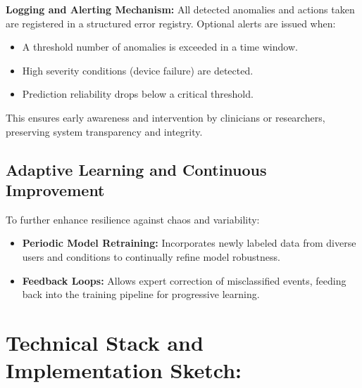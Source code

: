 \documentclass[conference]{IEEEtran}
\begin{document}
\item \textbf{Logging and Alerting Mechanism:}  
All detected anomalies and actions taken are registered in a structured error registry. Optional alerts are issued when:
\begin{itemize}
    \item A threshold number of anomalies is exceeded in a time window.
    \item High severity conditions (device failure) are detected.
    \item Prediction reliability drops below a critical threshold.
\end{itemize}
This ensures early awareness and intervention by clinicians or researchers, preserving system transparency and integrity.

\subsection{Adaptive Learning and Continuous Improvement}

To further enhance resilience against chaos and variability:
\begin{itemize}
\item \textbf{Periodic Model Retraining:} Incorporates newly labeled data from diverse users and conditions to continually refine model robustness.
\item \textbf{Feedback Loops:} Allows expert correction of misclassified events, feeding back into the training pipeline for progressive learning.
\end{itemize}

\section{Technical Stack and Implementation Sketch:}
\end{document}
